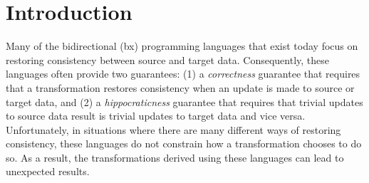 \documentclass[acmsmall,review,anonymous]{acmart}\settopmatter{printfolios=true,printccs=false,printacmref=false}
\theoremstyle{definition}
\begin{document}
\section{Introduction}
Many of the bidirectional (bx) programming languages that exist today focus on
restoring consistency between source and target data. Consequently, these languages often provide two guarantees: (1) a {\em correctness} guarantee that requires that a transformation restores consistency when an update is made to source or target data, and (2) a {\em hippocraticness} guarantee that requires that trivial updates to source data result is trivial updates to target data and vice versa. Unfortunately, in situations
where there are many different ways of restoring consistency, these languages
do not constrain how a transformation chooses to do so. As a result, the transformations derived using these languages can lead to unexpected results.
\end{document}
